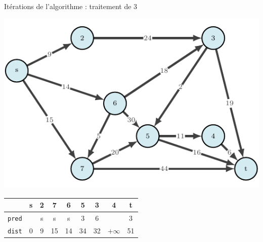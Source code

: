 \begin{frame}{Itérations de l'algorithme : traitement de $3$}
    \begin{center}
        \includegraphics[height=.6\textheight]{fig/dijkstra-0.pdf}      
    \begin{tabular}{c|cccccccc}
      
        & \textbf{s}   &\textbf{2}     &\textbf{7}     &\textbf{6}     &5      &\textbf{3}     &4      &t      \\
        \hline
        \texttt{pred} & &s      &s      &s      &3      &6      &       &3      \\
        \texttt{dist} & 0       &9      &15     &14     &34     &32     &$+\infty$    &51     \\
    \end{tabular}
\end{center}
\end{frame}

